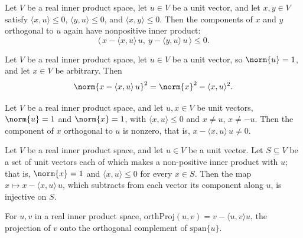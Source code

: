 \begin{lemma}
\label{CodingTheory.Johnson.inner_proj_le_zero}
\leanok
{}
Let $V$ be a real inner product space, let $u \in V$ be a unit vector, and let $x, y \in
V$ satisfy $\langle x, u\rangle \le 0$, $\langle y, u\rangle \le 0$, and $\langle x,
y\rangle \le 0$. Then the components of $x$ and $y$ orthogonal to $u$ again have
nonpositive inner product:
\[
\langle\, x - \langle x, u\rangle\, u,\ y - \langle y, u\rangle\, u \,\rangle \le 0.
\]
\end{lemma}

\begin{lemma}
\label{CodingTheory.Johnson.proj_norm_sq}
\leanok
{}
Let $V$ be a real inner product space, let $u \in V$ be a unit vector, so $\norm{u} =
1$, and let $x \in V$ be arbitrary. Then
\[
\norm{x - \langle x, u\rangle\, u}^2 = \norm{x}^2 - \langle x, u\rangle^2 .
\]
\end{lemma}

\begin{lemma}
\label{CodingTheory.Johnson.proj_nonzero}
\leanok
{}
Let $V$ be a real inner product space, and let $u, x \in V$ be unit vectors, $\norm{u} =
1$ and $\norm{x} = 1$, with $\langle x, u\rangle \le 0$ and $x \neq u$, $x \neq -u$.
Then the component of $x$ orthogonal to $u$ is nonzero, that is, $x - \langle x,
u\rangle\, u \neq 0$.
\end{lemma}

\begin{lemma}
\label{CodingTheory.Johnson.proj_inj_on}
\leanok
{}
Let $V$ be a real inner product space, and let $u \in V$ be a unit vector. Let $S
\subseteq V$ be a set of unit vectors each of which makes a non-positive inner product
with $u$; that is, $\norm{x} = 1$ and $\langle x, u\rangle \le 0$ for every $x \in S$.
Then the map $x \mapsto x - \langle x, u\rangle\, u$, which subtracts from each vector
its component along $u$, is injective on $S$.
\end{lemma}

\begin{definition}
\label{CodingTheory.Johnson.orthProj}
\leanok
For $u,v$ in a real inner product space, $\mathrm{orthProj}(u,v) = v - \langle u,v\rangle u$,
the projection of $v$ onto the orthogonal complement of $\mathrm{span}\{u\}$.
\end{definition}

